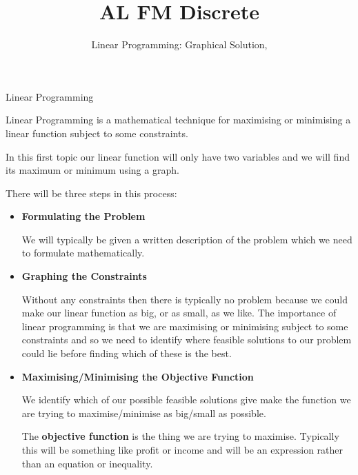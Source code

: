 \documentclass[8pt]{beamer}
\title[Discrete]{{\color{aa}\Huge\adfbullet{9}}AL FM Discrete}
\subtitle{Linear Programming: Graphical Solution, \textattachfile{LinearProgrammingGraphicalSolution.tex}{(TeX)}}
\begin{document}
\setlength{\abovedisplayskip}{0pt}
\setlength{\belowdisplayskip}{0pt}
\setlength{\abovedisplayshortskip}{0pt}
\setlength{\belowdisplayshortskip}{0pt}


\frame{\titlepage}

\begin{frame}[shrink=10]{Linear Programming}
	\begin{definition}
		Linear Programming is a mathematical technique for maximising or minimising a linear
function subject to some constraints.
	\end{definition}

	In this first topic our linear function will only have two variables and we will find its maximum or
minimum using a graph.

There will be three steps in this process:
\begin{itemize}
	\item \textbf{Formulating the Problem}

		We will typically be given a written description of the problem which we need to formulate
mathematically.

\item \textbf{Graphing the Constraints} 

	Without any constraints then there is typically no problem because we could make our
linear function as big, or as small, as we like. The importance of linear programming is that
we are maximising or minimising subject to some constraints and so we need to identify
where feasible solutions to our problem could lie before finding which of these is the best.

\item \textbf{Maximising/Minimising the Objective Function} 

	We identify which of our possible feasible solutions give
make the function we are trying to maximise/minimise as big/small as possible.

\begin{definition}
	The \textbf{objective function} is the thing we are trying
to maximise. Typically this will be something like
profit or income and will be an expression rather
than an equation or inequality.
\end{definition}
\end{itemize}

\end{frame}
\end{document}
